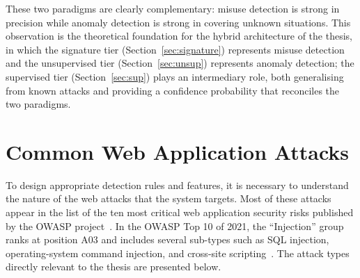 These two paradigms are clearly complementary: misuse detection is strong
in precision while anomaly detection is strong in covering unknown
situations. This observation is the theoretical foundation for the hybrid
architecture of the thesis, in which the signature tier
(Section~\ref{sec:signature}) represents misuse detection and the
unsupervised tier (Section~\ref{sec:unsup}) represents anomaly detection;
the supervised tier (Section~\ref{sec:sup}) plays an intermediary role,
both generalising from known attacks and providing a confidence
probability that reconciles the two paradigms.

\section{Common Web Application Attacks}
\label{sec:webattacks}

To design appropriate detection rules and features, it is necessary to
understand the nature of the web attacks that the system targets. Most of
these attacks appear in the list of the ten most critical web application
security risks published by the OWASP project~\cite{owasp2021}. In the
OWASP Top 10 of 2021, the ``Injection'' group ranks at position A03 and
includes several sub-types such as SQL injection, operating-system command
injection, and cross-site scripting~\cite{owasp2021}. The attack types
directly relevant to the thesis are presented below.


